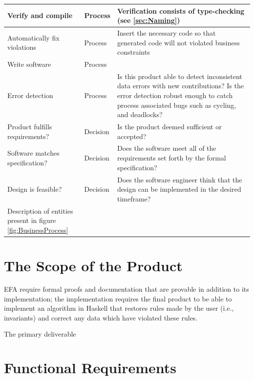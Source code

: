 \documentclass[12pt]{report}
\begin{document}
\begin{longtable}{ |m{4.5cm}|m{1.5cm}|m{7cm}|  }
Verify and compile & Process & Verification consists of type-checking (see 
\ref{sec:Naming}) \\ \hline
Automatically fix violations & Process & Insert the necessary code so that
  generated code will not violated business constraints \\ \hline
Write software & Process & \\ \hline
Error detection & Process & Is this product able to detect inconsistent data 
errors with new contributions? Is the error detection robust enough to catch 
process associated bugs such as cycling, and deadlocks?\\ \hline
Product  fulfills requirements? & Decision & Is the product deemed sufficient 
or accepted? \\ \hline
Software matches specification? & Decision & Does the software meet all of the
  requirements set forth by the formal specification? \\ \hline
Design is feasible? & Decision & Does the software engineer think that the
  design can be implemented in the desired timeframe? \\ 
\hline
 \caption{Description of entities present in figure \\ 
 \ref{fig:BusinessProcess}}
\end{longtable}


\section{The Scope of the Product}\label{sec:ScopeOfProduct}
EFA require formal proofs and documentation that are provable in addition to 
its implementation; the implementation requires the final product to be able to 
implement an algorithm in Haskell that restores rules made by the user (i.e., 
invariants) and correct any data which have violated these rules. 

The primary deliverable


\section{Functional Requirements}\label{sec:Functional}
\end{document}
